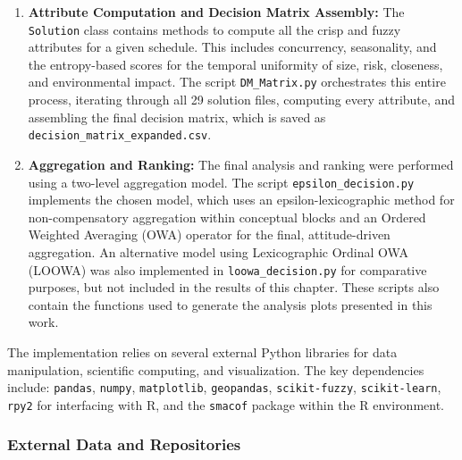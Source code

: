 \begin{enumerate}
    \item \textbf{Attribute Computation and Decision Matrix Assembly:} The \texttt{Solution} class contains methods to compute all the crisp and fuzzy attributes for a given schedule. This includes concurrency, seasonality, and the entropy-based scores for the temporal uniformity of size, risk, closeness, and environmental impact. The script \texttt{DM\_Matrix.py} orchestrates this entire process, iterating through all 29 solution files, computing every attribute, and assembling the final decision matrix, which is saved as \texttt{decision\_matrix\_expanded.csv}.

    \item \textbf{Aggregation and Ranking:} The final analysis and ranking were performed using a two-level aggregation model. The script \texttt{epsilon\_decision.py} implements the chosen model, which uses an epsilon-lexicographic method for non-compensatory aggregation within conceptual blocks and an Ordered Weighted Averaging (OWA) operator for the final, attitude-driven aggregation. An alternative model using Lexicographic Ordinal OWA (LOOWA) was also implemented in \texttt{loowa\_decision.py} for comparative purposes, but not included in the results of this chapter. These scripts also contain the functions used to generate the analysis plots presented in this work.
\end{enumerate}

The implementation relies on several external Python libraries for data manipulation, scientific computing, and visualization. The key dependencies include: \texttt{pandas}, \texttt{numpy}, \texttt{matplotlib}, \texttt{geopandas}, \texttt{scikit-fuzzy}, \texttt{scikit-learn}, \texttt{rpy2} for interfacing with R, and the \texttt{smacof} package within the R environment.

\subsubsection*{External Data and Repositories}

